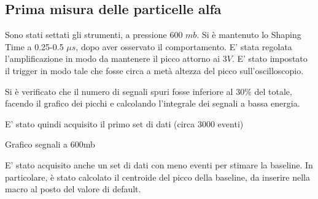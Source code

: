 \subsection{Prima misura delle particelle alfa}
\FloatBarrier
Sono stati settati gli strumenti, a pressione 600 $mb$.
Si è mantenuto lo Shaping Time a 0.25-0.5 $\mu s$, dopo aver osservato il comportamento. %
E' stata regolata l'amplificazione in modo da mantenere il picco attorno ai $3V$.
E' stato impostato il trigger in modo tale che fosse circa a metà altezza del picco sull'oscilloscopio. 


Si è verificato che il numero di segnali spuri fosse inferiore al $30 \%$ del totale, facendo il grafico dei picchi e calcolando l'integrale dei segnali a bassa energia.

E' stato quindi acquisito il primo set di dati (circa 3000 eventi)

\begin{grafico}
 \centering
 \caption{Grafico segnali a 600mb} 
 \label{gr:misura_600} 
\end{grafico}


E' stato acquisito anche un set di dati con meno eventi per stimare la baseline.
In particolare, è stato calcolato il centroide del picco della baseline, da inserire nella macro al posto del valore di default.

